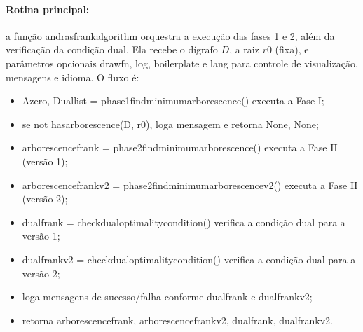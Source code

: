 \documentclass[12pt,a4paper]{article}
\def\texttt#1{#1}%
\def\_{}%
\begin{document}
\paragraph{Rotina principal:}
    a função \texttt{andras\_frank\_algorithm} orquestra a execução das fases 1 e 2, além da verificação da condição dual. Ela recebe o dígrafo \(D\), a raiz \(r0\) (fixa), e parâmetros opcionais \texttt{draw\_fn}, \texttt{log}, \texttt{boilerplate} e \texttt{lang} para controle de visualização, mensagens e idioma. O fluxo é:

\begin{itemize}\setlength{\itemsep}{1pt}
    \item \texttt{A\_zero, Dual\_list = phase1\_find\_minimum\_arborescence()} executa a Fase I;
    \item se \texttt{not has\_arborescence(D, r0)}, loga mensagem e retorna \texttt{None, None};
    \item \texttt{arborescence\_frank = phase2\_find\_minimum\_arborescence()} executa a Fase II (versão 1);
    \item \texttt{arborescence\_frank\_v2 = phase2\_find\_minimum\_arborescence\_v2()} executa a Fase II (versão 2);
    \item \texttt{dual\_frank = check\_dual\_optimality\_condition()} verifica a condição dual para a versão 1;
    \item \texttt{dual\_frank\_v2 = check\_dual\_optimality\_condition()} verifica a condição dual para a versão 2;
    \item loga mensagens de sucesso/falha conforme \texttt{dual\_frank} e \texttt{dual\_frank\_v2};
    \item retorna \texttt{arborescence\_frank, arborescence\_frank\_v2, dual\_frank, dual\_frank\_v2}.
\end{itemize}
\end{document}
